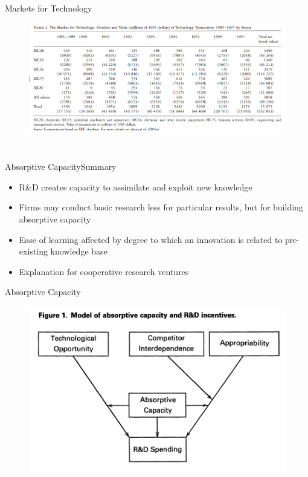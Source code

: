 \documentclass{beamer}
\begin{document}
\begin{frame}{Markets for Technology}{}
\begin{figure}[h]
\begin{centering}
  \includegraphics[width=\textwidth]{0302}
   \label{fig:0302}
\end{centering}
\end{figure}
\end{frame}

\section{\cite{Cohen1990}}
\begin{frame}{Absorptive Capacity}{Summary}
\begin{itemize}
\item{R\&D creates capacity to assimilate and exploit new knowledge}
\item{Firms may conduct basic research less for particular results, but for building absorptive capacity}
\item{Ease of learning affected by degree to which an innovation is related to pre-existing knowledge base}
\item{Explanation for cooperative research ventures}
\end{itemize}
\end{frame}

\begin{frame}{Absorptive Capacity}{}
\begin{figure}[h]
\begin{centering}
  \includegraphics[width=\textwidth]{0401}
   \label{fig:0401}
\end{centering}
\end{figure}
\end{frame}
\end{document}
